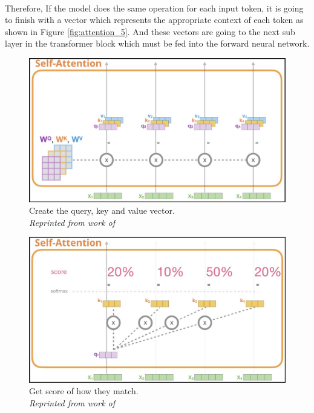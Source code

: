 \paragraph{}
Therefore, If the model does the same operation for each input token, it is going to finish with a vector which represents the appropriate context of each token as shown in Figure \ref{fig:attention_5}. And these vectors are going to the next sub layer in the transformer block which must be fed into the forward neural network.
\begin{figure}[H]
  \centering
  \caption[Create the query, key and value vector.]{Create the query, key and value vector. \\\hspace{\textwidth} \emph{Reprinted from work of \citeauthor{alammar_2018} \citeyear{alammar_2018}}}\label{fig:attention_2}
  \includegraphics[scale = 0.3]{figures/attention_2.jpg}  
\end{figure}

\begin{figure}[H]
  \centering
  \caption[Get score of how they match.]{Get score of how they match. \\\hspace{\textwidth} \emph{Reprinted from work of \citeauthor{alammar_2018} \citeyear{alammar_2018}}}\label{fig:attention_3}
  \includegraphics[scale = 0.3]{figures/attention_3.jpg}  
\end{figure}

